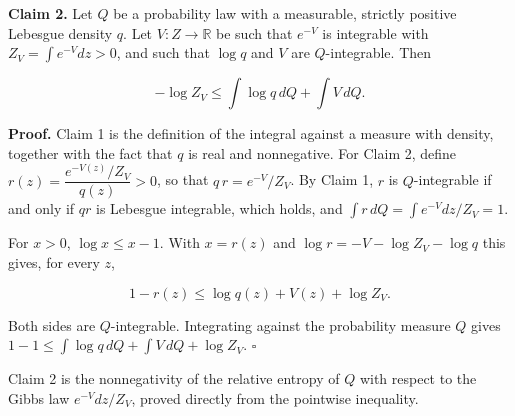 \documentclass[11pt,a4paper]{report}
\begin{document}
\textbf{Claim 2.} Let \(Q\) be a probability law with a measurable, strictly positive Lebesgue density \(q\). Let \(V:Z\to\mathbb R\) be such that \(e^{-V}\) is integrable with \(Z_V=\int e^{-V}dz>0\), and such that \(\log q\) and \(V\) are \(Q\)-integrable. Then


\[-\log Z_V\le\int\log q\,dQ+\int V\,dQ.\]


\textbf{Proof.} Claim 1 is the definition of the integral against a measure with density, together with the fact that \(q\) is real and nonnegative. For Claim 2, define \(r(z)=\dfrac{e^{-V(z)}/Z_V}{q(z)}>0\), so that \(q\,r=e^{-V}/Z_V\). By Claim 1, \(r\) is \(Q\)-integrable if and only if \(qr\) is Lebesgue integrable, which holds, and \(\int r\,dQ=\int e^{-V}dz/Z_V=1\).




For \(x>0\), \(\log x\le x-1\). With \(x=r(z)\) and \(\log r=-V-\log Z_V-\log q\) this gives, for every \(z\),


\[1-r(z)\le\log q(z)+V(z)+\log Z_V.\]


Both sides are \(Q\)-integrable. Integrating against the probability measure \(Q\) gives \(1-1\le\int\log q\,dQ+\int V\,dQ+\log Z_V\). \(\square\)




Claim 2 is the nonnegativity of the relative entropy of \(Q\) with respect to the Gibbs law \(e^{-V}dz/Z_V\), proved directly from the pointwise inequality.
\end{document}
